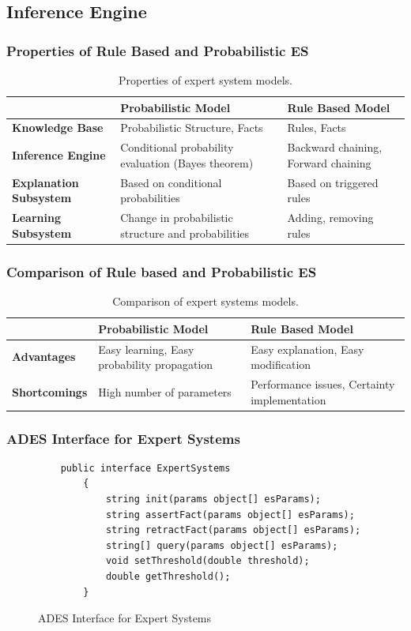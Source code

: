 \documentclass{beamer}
\newenvironment{mylisting}
{\begin{list}{}{\setlength{\leftmargin}{1em}}\item\scriptsize\bfseries}
{\end{list}}
\begin{document}
\subsection{Inference Engine}
\frame
{
	\frametitle{Properties of Rule Based and Probabilistic ES}
	\begin{table}
	\caption{Properties of expert system models.}
	\centering
	{\tiny
	\begin{tabular}{|p{30mm}|p{30mm}|p{30mm}|}
	\hline
	 & {\bf Probabilistic Model} & {\bf Rule Based Model} \\
	\hline
	{\bf Knowledge Base} & Probabilistic Structure,  Facts & Rules, Facts \\
	\hline
	{\bf Inference Engine} & Conditional probability evaluation (Bayes theorem) & Backward chaining, Forward chaining \\
	\hline
	{\bf Explanation Subsystem} & Based on conditional probabilities & Based on triggered rules \\
	\hline
	{\bf Learning Subsystem} & Change in probabilistic structure and probabilities & Adding, removing rules \\
	\hline
	\end{tabular}
	}
	\label{tabESprop}
	\end{table}
}

\frame
{
	\frametitle{Comparison of Rule based and Probabilistic ES}
	\begin{table}
	\caption{Comparison of expert systems models.}
	\centering
	{\tiny
	\begin{tabular}{|p{30mm}|p{30mm}|p{30mm}|}
	\hline
	 & {\bf Probabilistic Model} & {\bf Rule Based Model} \\
	\hline
	{\bf Advantages} & Easy learning, Easy probability propagation & Easy explanation, Easy modification \\
	\hline
	{\bf Shortcomings} & High number of parameters & Performance issues, Certainty implementation \\
	\hline
	\end{tabular}  
	}
	\label{tabESComp}
	\end{table}
}

\begin{frame}[fragile]
	\frametitle{ADES Interface for Expert Systems}
  \begin{figure}[!ht]
  \centering
  \begin{mylisting}
	\begin{verbatim}
	public interface ExpertSystems
        {
            string init(params object[] esParams);
            string assertFact(params object[] esParams);
            string retractFact(params object[] esParams);
            string[] query(params object[] esParams);
            void setThreshold(double threshold);
            double getThreshold();
        }
	\end{verbatim}
	\end{mylisting}
  \caption{ADES Interface for Expert Systems}
  \label{fig:interface}
  \end{figure}
\end{frame}
\end{document}
